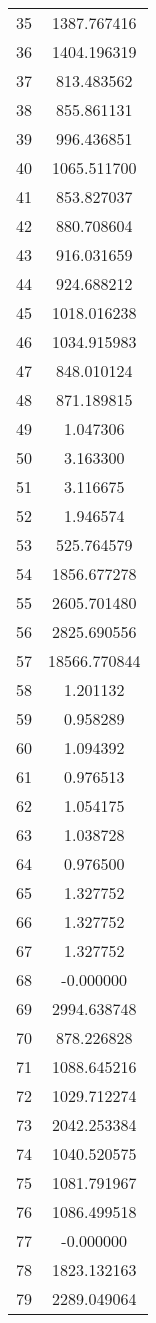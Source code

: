 \documentclass[12pt]{article}
\begin{document}
\begin{longtable}{@{}cc@{}}
35 & 1387.767416 \\
36 & 1404.196319 \\
37 & 813.483562 \\
38 & 855.861131 \\
39 & 996.436851 \\
40 & 1065.511700 \\
41 & 853.827037 \\
42 & 880.708604 \\
43 & 916.031659 \\
44 & 924.688212 \\
45 & 1018.016238 \\
46 & 1034.915983 \\
47 & 848.010124 \\
48 & 871.189815 \\
49 & 1.047306 \\
50 & 3.163300 \\
51 & 3.116675 \\
52 & 1.946574 \\
53 & 525.764579 \\
54 & 1856.677278 \\
55 & 2605.701480 \\
56 & 2825.690556 \\
57 & 18566.770844 \\
58 & 1.201132 \\
59 & 0.958289 \\
60 & 1.094392 \\
61 & 0.976513 \\
62 & 1.054175 \\
63 & 1.038728 \\
64 & 0.976500 \\
65 & 1.327752 \\
66 & 1.327752 \\
67 & 1.327752 \\
68 & -0.000000 \\
69 & 2994.638748 \\
70 & 878.226828 \\
71 & 1088.645216 \\
72 & 1029.712274 \\
73 & 2042.253384 \\
74 & 1040.520575 \\
75 & 1081.791967 \\
76 & 1086.499518 \\
77 & -0.000000 \\
78 & 1823.132163 \\
79 & 2289.049064 \\

\end{longtable}
\end{document}
